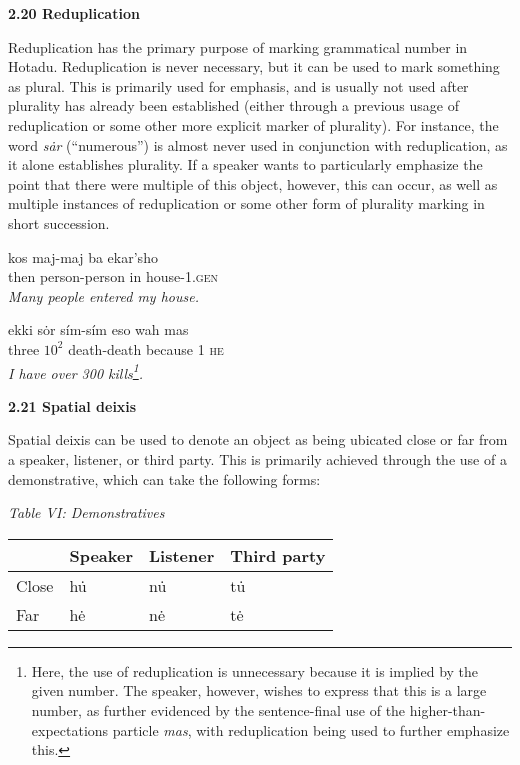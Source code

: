 \documentclass{article}[10pt]
\begin{document}
{\bf 2.20 Reduplication}

Reduplication has the primary purpose of marking grammatical number in Hotadu. Reduplication is never necessary, but it can be used to mark something as plural. This is primarily used for emphasis, and is usually not used after plurality has already been established (either through a previous usage of reduplication or some other more explicit marker of plurality). For instance, the word \emph{s\.{a}r} (``numerous'') is almost never used in conjunction with reduplication, as it alone establishes plurality. If a speaker wants to particularly emphasize the point that there were multiple of this object, however, this can occur, as well as multiple instances of reduplication or some other form of plurality marking in short succession.
\begin{exe}
\ex
\gll kos maj-maj ba ekar'sho\\
then person-person in house-\textsc{1.gen}\\
\trans \emph{Many people entered my house.}

\ex
\gll ekki s\.{o}r s\'{i}m-s\'{i}m eso wah mas\\
three $10^2$ death-death because 1 \textsc{he}\\
\trans \emph{I have over 300 kills\emph{\footnote{Here, the use of reduplication is unnecessary because it is implied by the given number. The speaker, however, wishes to express that this is a large number, as further evidenced by the sentence-final use of the higher-than-expectations particle \emph{mas}, with reduplication being used to further emphasize this.}}.}
\end{exe}

{\bf 2.21 Spatial deixis}

Spatial deixis can be used to denote an object as being ubicated close or far from a speaker, listener, or third party. This is primarily achieved through the use of a demonstrative, which can take the following forms:

\begin{center}
\emph{Table VI: Demonstratives}
\begin{tabularx}{\textwidth}{ |X|X|X|X| }
\hline
 & \bf{Speaker} & \bf{Listener} & \bf{Third party}\\ \hline
 Close & h\.{u} & n\.{u} & t\.{u} \\ \hline
 Far & h\.{e} & n\.{e} & t\.{e} \\ \hline
\end{tabularx}
\end{center}
\end{document}
